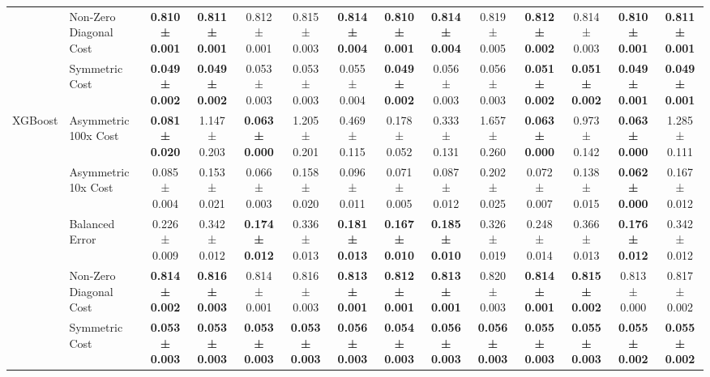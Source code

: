 \begin{table}[H]
{\begin{tabular}{llcccccccccccc}
 & Non-Zero Diagonal Cost & \textbf{0.810 ± 0.001} & \textbf{0.811 ± 0.001} & 0.812 ± 0.001 & 0.815 ± 0.003 & \textbf{0.814 ± 0.004} & \textbf{0.810 ± 0.001} & \textbf{0.814 ± 0.004} & 0.819 ± 0.005 & \textbf{0.812 ± 0.002} & 0.814 ± 0.003 & \textbf{0.810 ± 0.001} & \textbf{0.811 ± 0.001} \\
 & Symmetric Cost & \textbf{0.049 ± 0.002} & \textbf{0.049 ± 0.002} & 0.053 ± 0.003 & 0.053 ± 0.003 & 0.055 ± 0.004 & \textbf{0.049 ± 0.002} & 0.056 ± 0.003 & 0.056 ± 0.003 & \textbf{0.051 ± 0.002} & \textbf{0.051 ± 0.002} & \textbf{0.049 ± 0.001} & \textbf{0.049 ± 0.001} \\
\cline{1-14}
\multirow[t]{5}{*}{XGBoost} & Asymmetric 100x Cost & \textbf{0.081 ± 0.020} & 1.147 ± 0.203 & \textbf{0.063 ± 0.000} & 1.205 ± 0.201 & 0.469 ± 0.115 & 0.178 ± 0.052 & 0.333 ± 0.131 & 1.657 ± 0.260 & \textbf{0.063 ± 0.000} & 0.973 ± 0.142 & \textbf{0.063 ± 0.000} & 1.285 ± 0.111 \\
 & Asymmetric 10x Cost & 0.085 ± 0.004 & 0.153 ± 0.021 & 0.066 ± 0.003 & 0.158 ± 0.020 & 0.096 ± 0.011 & 0.071 ± 0.005 & 0.087 ± 0.012 & 0.202 ± 0.025 & 0.072 ± 0.007 & 0.138 ± 0.015 & \textbf{0.062 ± 0.000} & 0.167 ± 0.012 \\
 & Balanced Error & 0.226 ± 0.009 & 0.342 ± 0.012 & \textbf{0.174 ± 0.012} & 0.336 ± 0.013 & \textbf{0.181 ± 0.013} & \textbf{0.167 ± 0.010} & \textbf{0.185 ± 0.010} & 0.326 ± 0.019 & 0.248 ± 0.014 & 0.366 ± 0.013 & \textbf{0.176 ± 0.012} & 0.342 ± 0.012 \\
 & Non-Zero Diagonal Cost & \textbf{0.814 ± 0.002} & \textbf{0.816 ± 0.003} & 0.814 ± 0.001 & 0.816 ± 0.003 & \textbf{0.813 ± 0.001} & \textbf{0.812 ± 0.001} & \textbf{0.813 ± 0.001} & 0.820 ± 0.003 & \textbf{0.814 ± 0.001} & \textbf{0.815 ± 0.002} & 0.813 ± 0.000 & 0.817 ± 0.002 \\
 & Symmetric Cost & \textbf{0.053 ± 0.003} & \textbf{0.053 ± 0.003} & \textbf{0.053 ± 0.003} & \textbf{0.053 ± 0.003} & \textbf{0.056 ± 0.003} & \textbf{0.054 ± 0.003} & \textbf{0.056 ± 0.003} & \textbf{0.056 ± 0.003} & \textbf{0.055 ± 0.003} & \textbf{0.055 ± 0.003} & \textbf{0.055 ± 0.002} & \textbf{0.055 ± 0.002} \\
\cline{1-14}
\bottomrule
\end{tabular}
    }
\end{table}
